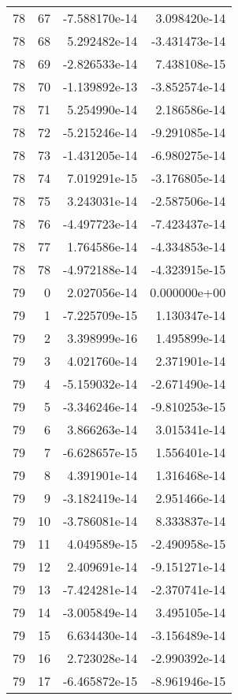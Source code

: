 \begin{tabular}{rrrr}
  78 &   67 & -7.588170e-14 &  3.098420e-14 \\
  78 &   68 &  5.292482e-14 & -3.431473e-14 \\
  78 &   69 & -2.826533e-14 &  7.438108e-15 \\
  78 &   70 & -1.139892e-13 & -3.852574e-14 \\
  78 &   71 &  5.254990e-14 &  2.186586e-14 \\
  78 &   72 & -5.215246e-14 & -9.291085e-14 \\
  78 &   73 & -1.431205e-14 & -6.980275e-14 \\
  78 &   74 &  7.019291e-15 & -3.176805e-14 \\
  78 &   75 &  3.243031e-14 & -2.587506e-14 \\
  78 &   76 & -4.497723e-14 & -7.423437e-14 \\
  78 &   77 &  1.764586e-14 & -4.334853e-14 \\
  78 &   78 & -4.972188e-14 & -4.323915e-15 \\
  79 &    0 &  2.027056e-14 &  0.000000e+00 \\
  79 &    1 & -7.225709e-15 &  1.130347e-14 \\
  79 &    2 &  3.398999e-16 &  1.495899e-14 \\
  79 &    3 &  4.021760e-14 &  2.371901e-14 \\
  79 &    4 & -5.159032e-14 & -2.671490e-14 \\
  79 &    5 & -3.346246e-14 & -9.810253e-15 \\
  79 &    6 &  3.866263e-14 &  3.015341e-14 \\
  79 &    7 & -6.628657e-15 &  1.556401e-14 \\
  79 &    8 &  4.391901e-14 &  1.316468e-14 \\
  79 &    9 & -3.182419e-14 &  2.951466e-14 \\
  79 &   10 & -3.786081e-14 &  8.333837e-14 \\
  79 &   11 &  4.049589e-15 & -2.490958e-15 \\
  79 &   12 &  2.409691e-14 & -9.151271e-14 \\
  79 &   13 & -7.424281e-14 & -2.370741e-14 \\
  79 &   14 & -3.005849e-14 &  3.495105e-14 \\
  79 &   15 &  6.634430e-14 & -3.156489e-14 \\
  79 &   16 &  2.723028e-14 & -2.990392e-14 \\
  79 &   17 & -6.465872e-15 & -8.961946e-15 \\

\end{tabular}
